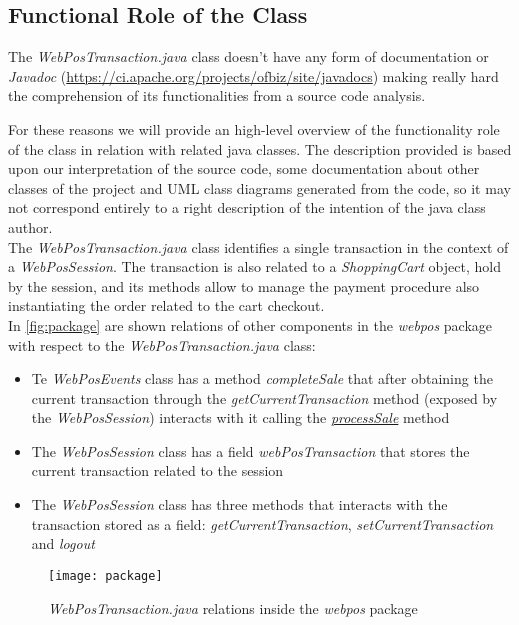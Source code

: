 \subsection{Functional Role of the Class}
The \emph{WebPosTransaction.java} class doesn't have any form of documentation or \emph{Javadoc} (\url{https://ci.apache.org/projects/ofbiz/site/javadocs}) making really hard the comprehension of its functionalities from a source code analysis.

For these reasons we will provide an high-level overview of the functionality role of the class in relation with related java classes. The description provided is based upon our interpretation of the source code, some documentation about other classes of the project and UML class diagrams generated from the code, so it may not correspond entirely to a right description of the intention of the java class author.\\

The \emph{WebPosTransaction.java} class identifies a single transaction in the context of a \emph{WebPosSession}. The transaction is also related to a \emph{ShoppingCart} object, hold by the session, and its methods allow to manage the payment procedure also instantiating the order related to the cart checkout. \\

In \autoref{fig:package} are shown relations of other components in the \emph{webpos} package with respect to the \emph{WebPosTransaction.java} class:
\begin{itemize}
	\item Te \emph{WebPosEvents} class has a method \emph{completeSale} that after obtaining the current transaction through the \emph{getCurrentTransaction} method (exposed by the \emph{WebPosSession}) interacts with it calling the \hyperref[method:processSale]{\emph{processSale}} method
	\item The \emph{WebPosSession} class has a field \emph{webPosTransaction} that stores the current transaction related to the session
	\item The \emph{WebPosSession} class has three methods that interacts with the transaction stored as a field: \emph{getCurrentTransaction}, \emph{setCurrentTransaction} and \emph{logout}
\end{itemize}

\begin{figure}[h]
			\centering
			\texttt{[image: package]}
			\caption{
				\label{fig:package} 
				\emph{WebPosTransaction.java} relations inside the \emph{webpos} package
			}
\end{figure}

